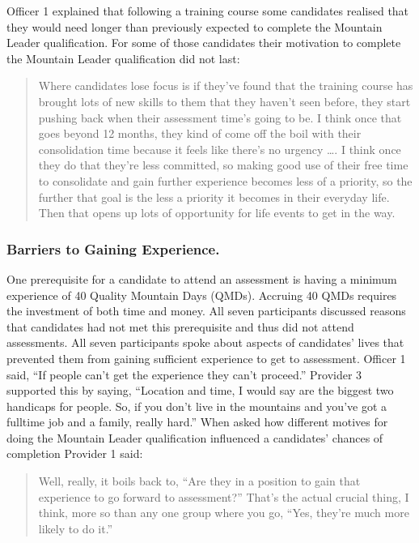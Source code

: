 \documentclass[
  12pt,
  a4paper,
]{book}
\begin{document}
Officer 1 explained that following a training course some candidates realised that they would need longer than previously expected to complete the Mountain Leader qualification. For some of those candidates their motivation to complete the Mountain Leader qualification did not last:

\begin{quote}
Where candidates lose focus is if they've found that the training course has brought lots of new skills to them that they haven't seen before, they start pushing back when their assessment time's going to be. I think once that goes beyond 12 months, they kind of come off the boil with their consolidation time because it feels like there's no urgency \ldots. I think once they do that they're less committed, so making good use of their free time to consolidate and gain further experience becomes less of a priority, so the further that goal is the less a priority it becomes in their everyday life. Then that opens up lots of opportunity for life events to get in the way.
\end{quote}

\hypertarget{qual-gta-gaining-experience}{%
\subsubsection{Barriers to Gaining Experience.}\label{qual-gta-gaining-experience}}

One prerequisite for a candidate to attend an assessment is having a minimum experience of 40 Quality Mountain Days (QMDs). Accruing 40 QMDs requires the investment of both time and money. All seven participants discussed reasons that candidates had not met this prerequisite and thus did not attend assessments. All seven participants spoke about aspects of candidates' lives that prevented them from gaining sufficient experience to get to assessment. Officer 1 said, ``If people can't get the experience they can't proceed.'' Provider 3 supported this by saying, ``Location and time, I would say are the biggest two handicaps for people. So, if you don't live in the mountains and you've got a fulltime job and a family, really hard.'' When asked how different motives for doing the Mountain Leader qualification influenced a candidates' chances of completion Provider 1 said:

\begin{quote}
Well, really, it boils back to, ``Are they in a position to gain that experience to go forward to assessment?'' That's the actual crucial thing, I think, more so than any one group where you go, ``Yes, they're much more likely to do it.''
\end{quote}
\end{document}
